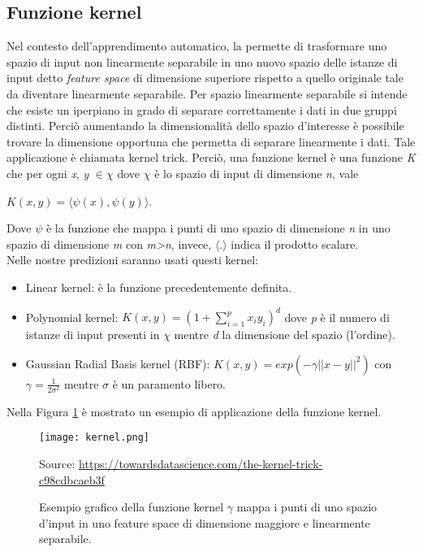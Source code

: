\subsection{Funzione kernel}
Nel contesto dell'apprendimento automatico, la \textit{\cite{kernel}} permette di trasformare uno spazio di input non linearmente separabile in uno nuovo spazio delle istanze di input detto \emph{feature space} di dimensione superiore rispetto a quello originale tale da diventare linearmente separabile. Per spazio linearmente separabile si intende che esiste un iperpiano in grado di separare correttamente i dati in due gruppi distinti. Perciò aumentando la dimensionalità dello spazio d'interesse è possibile trovare la dimensione opportuna che permetta di separare linearmente i dati. Tale applicazione è chiamata kernel trick. Perciò, una funzione kernel è una funzione \emph{K} che per ogni \emph{x}, \emph{y} $\in \chi$ dove $\chi$ è lo spazio di input di dimensione \emph{n}, vale 
\begin{center}
	$K(x,y) =  \langle\psi(x),\psi(y)\rangle $.
\end{center}
Dove $\psi$ è la funzione che mappa i punti di uno spazio di dimensione \emph{n} in uno spazio di dimensione \emph{m} con \emph{m>n}, invece, $\langle . \rangle$ indica il prodotto scalare.\\
Nelle nostre predizioni saranno usati questi kernel:
\begin{itemize}
	\item Linear kernel: è la funzione precedentemente definita.
	\item Polynomial kernel: $K(x,y) =  \left(1 + \sum_{i = 1}^{p}x_iy_i\right)^{d} $ dove \emph{p} è il numero di istanze di input presenti in $\chi$ mentre \emph{d} la dimensione del spazio (l'ordine).
	\item Gaussian Radial Basis kernel (RBF): $K(x,y) = exp(-\gamma||x-y||^2) $ con $\gamma=\frac{1}{2\sigma^2}$ mentre $\sigma$ è un paramento libero. 
\end{itemize}

Nella Figura \ref{fig:kernel} è mostrato un esempio di applicazione della funzione kernel.\\

\begin{figure}[h]
	\begin{center}
		\texttt{[image: kernel.png]}
		\caption{Esempio grafico della funzione kernel $\gamma$ mappa i punti di uno spazio d'input in uno feature space di dimensione maggiore e linearmente separabile.
		} 
		Source: \url{https://towardsdatascience.com/the-kernel-trick-c98cdbcaeb3f}\label{fig:kernel}
	\end{center}
\end{figure}

